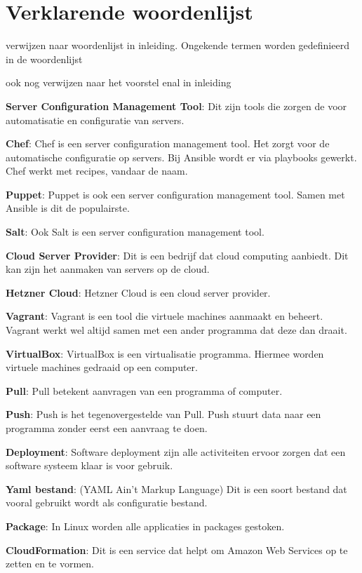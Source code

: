 \chapter{Verklarende woordenlijst}
verwijzen naar woordenlijst in inleiding. Ongekende termen worden gedefinieerd in de woordenlijst

ook nog verwijzen naar het voorstel enal in inleiding

\textbf{Server Configuration Management Tool}: Dit zijn tools die zorgen de voor automatisatie en configuratie van servers.

\textbf{Chef}: Chef is een server configuration management tool. Het zorgt voor de automatische configuratie op servers. Bij Ansible wordt er via playbooks gewerkt. Chef werkt met recipes, vandaar de naam.

\textbf{Puppet}: Puppet is ook een server configuration management tool. Samen met Ansible is dit de populairste.   

\textbf{Salt}: Ook Salt is een server configuration management tool.  

\textbf{Cloud Server Provider}: Dit is een bedrijf dat cloud computing aanbiedt. Dit kan zijn het aanmaken van servers op de cloud.

\textbf{Hetzner Cloud}: Hetzner Cloud is een cloud server provider.

\textbf{Vagrant}: Vagrant is een tool die virtuele machines aanmaakt en beheert. Vagrant werkt wel altijd samen met een ander programma dat deze dan draait.

\textbf{VirtualBox}: VirtualBox is een virtualisatie programma. Hiermee worden  virtuele machines gedraaid op een computer.

\textbf{Pull}: Pull betekent aanvragen van een programma of computer.

\textbf{Push}: Push is het tegenovergestelde van Pull. Push stuurt data naar een programma zonder eerst een aanvraag te doen.

\textbf{Deployment}: Software deployment zijn alle activiteiten ervoor zorgen dat een software systeem klaar is voor gebruik.

\textbf{Yaml bestand}: (YAML Ain't Markup Language) Dit is een soort bestand dat vooral gebruikt wordt als configuratie bestand.

\textbf{Package}: In Linux worden alle applicaties in packages gestoken.

\textbf{CloudFormation}: Dit is een service dat helpt om Amazon Web Services op te zetten en te vormen.

